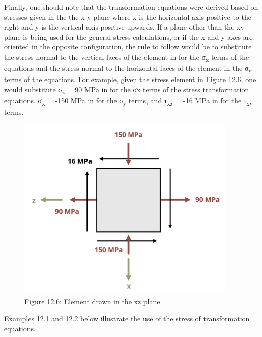 \documentclass[
  letterpaper,
  DIV=11,
  numbers=noendperiod]{scrreprt}
\theoremstyle{definition}
\theoremstyle{remark}
\begin{document}
Finally, one should note that the transformation equations were derived
based on stresses given in the the x-y plane where x is the horizontal
axis positive to the right and y is the vertical axis positive upwards.
If a plane other than the xy plane is being used for the general stress
calculations, or if the x and y axes are oriented in the opposite
configuration, the rule to follow would be to substitute the stress
normal to the vertical faces of the element in for the
σ\textsubscript{x} terms of the equations and the stress normal to the
horizontal faces of the element in the σ\textsubscript{y} terms of the
equations. For example, given the stress element in Figure 12.6, one
would substitute σ\textsubscript{z} = 90 MPa in for the σx terms of the
stress transformation equations, σ\textsubscript{x} = -150 MPa in for
the σ\textsubscript{y} terms, and τ\textsubscript{xz} = -16 MPa in for
the τ\textsubscript{xy} terms.

\begin{figure}[H]

{\centering \includegraphics[width=4.10417in,height=\textheight]{images/CH12 figures/figure 12.6.png}

}

\caption{Figure 12.6: Element drawn in the xz plane}

\end{figure}%

Examples 12.1 and 12.2 below illustrate the use of the stress of
transformation equations.
\end{document}
